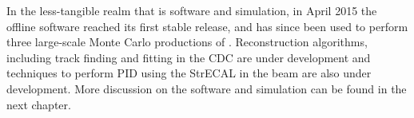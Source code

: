 In the less-tangible realm that is software and simulation, in April 2015 the offline software reached its first stable release, and has since been used to perform three large-scale Monte Carlo productions of \phaseI.
Reconstruction algorithms, including track finding and fitting in the \ac{CDC} are under development and techniques to perform \ac{PID} using the \ac{StrECAL} in the \phaseI beam are also under development.
More discussion on the software and simulation can be found in the next chapter.
